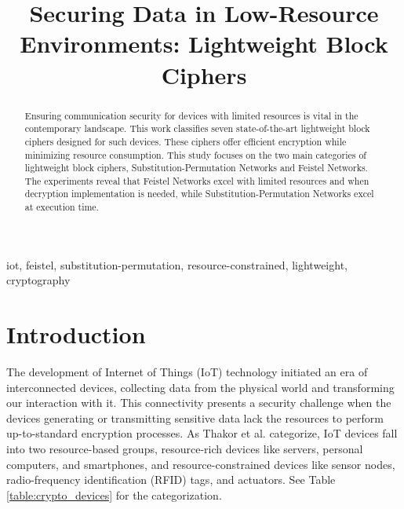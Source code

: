\documentclass[conference]{IEEEtran}
\begin{document}
\title{Securing Data in Low-Resource Environments: Lightweight Block Ciphers}


\author{
\and
{}
}


\maketitle

\begin{abstract}
  Ensuring communication security for devices with limited resources is vital in the contemporary landscape. This work classifies seven state-of-the-art lightweight block ciphers designed for such devices. These ciphers offer efficient encryption while minimizing resource consumption. This study focuses on the two main categories of lightweight block ciphers, Substitution-Permutation Networks and Feistel Networks. The experiments reveal that Feistel Networks excel with limited resources and when decryption implementation is needed, while Substitution-Permutation Networks excel at execution time.
\end{abstract}

\begin{IEEEkeywords}
iot, feistel, substitution-permutation, resource-constrained, lightweight, cryptography
\end{IEEEkeywords}

\section{Introduction}\label{sec:intro}

The development of Internet of Things (IoT) technology initiated an era of interconnected devices, collecting data from the physical world and transforming our interaction with it. This connectivity presents a security challenge when the devices generating or transmitting sensitive data lack the resources to perform up-to-standard encryption processes. As Thakor et al. \cite{IoT_1} categorize, IoT devices fall into two resource-based groups, resource-rich devices like servers, personal computers, and smartphones, and resource-constrained devices like sensor nodes, radio-frequency identification (RFID) tags, and actuators. See Table \ref{table:crypto_devices} for the categorization.
\end{document}
